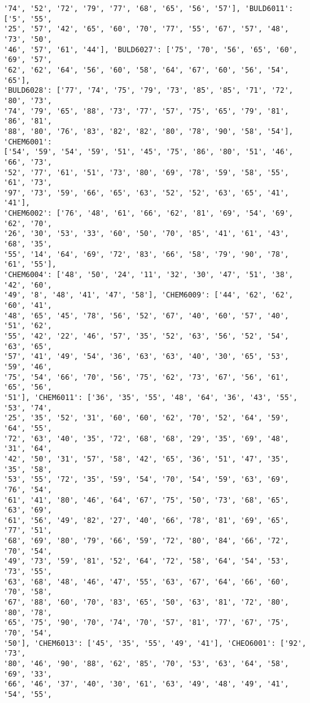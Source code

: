 \documentclass[11pt]{article}
\begin{document}
\begin{Verbatim}[commandchars=\\\{\}]
'74', '52', '72', '79', '77', '68', '65', '56', '57'], 'BULD6011': ['5', '55',
'25', '57', '42', '65', '60', '70', '77', '55', '67', '57', '48', '73', '50',
'46', '57', '61', '44'], 'BULD6027': ['75', '70', '56', '65', '60', '69', '57',
'62', '62', '64', '56', '60', '58', '64', '67', '60', '56', '54', '65'],
'BULD6028': ['77', '74', '75', '79', '73', '85', '85', '71', '72', '80', '73',
'74', '79', '65', '88', '73', '77', '57', '75', '65', '79', '81', '86', '81',
'88', '80', '76', '83', '82', '82', '80', '78', '90', '58', '54'], 'CHEM6001':
['54', '59', '54', '59', '51', '45', '75', '86', '80', '51', '46', '66', '73',
'52', '77', '61', '51', '73', '80', '69', '78', '59', '58', '55', '61', '73',
'97', '73', '59', '66', '65', '63', '52', '52', '63', '65', '41', '41'],
'CHEM6002': ['76', '48', '61', '66', '62', '81', '69', '54', '69', '62', '70',
'26', '30', '53', '33', '60', '50', '70', '85', '41', '61', '43', '68', '35',
'55', '14', '64', '69', '72', '83', '66', '58', '79', '90', '78', '61', '55'],
'CHEM6004': ['48', '50', '24', '11', '32', '30', '47', '51', '38', '42', '60',
'49', '8', '48', '41', '47', '58'], 'CHEM6009': ['44', '62', '62', '60', '41',
'48', '65', '45', '78', '56', '52', '67', '40', '60', '57', '40', '51', '62',
'55', '42', '22', '46', '57', '35', '52', '63', '56', '52', '54', '63', '65',
'57', '41', '49', '54', '36', '63', '63', '40', '30', '65', '53', '59', '46',
'75', '54', '66', '70', '56', '75', '62', '73', '67', '56', '61', '65', '56',
'51'], 'CHEM6011': ['36', '35', '55', '48', '64', '36', '43', '55', '53', '74',
'25', '35', '52', '31', '60', '60', '62', '70', '52', '64', '59', '64', '55',
'72', '63', '40', '35', '72', '68', '68', '29', '35', '69', '48', '31', '64',
'42', '50', '31', '57', '58', '42', '65', '36', '51', '47', '35', '35', '58',
'53', '55', '72', '35', '59', '54', '70', '54', '59', '63', '69', '76', '54',
'61', '41', '80', '46', '64', '67', '75', '50', '73', '68', '65', '63', '69',
'61', '56', '49', '82', '27', '40', '66', '78', '81', '69', '65', '77', '51',
'68', '69', '80', '79', '66', '59', '72', '80', '84', '66', '72', '70', '54',
'49', '73', '59', '81', '52', '64', '72', '58', '64', '54', '53', '73', '55',
'63', '68', '48', '46', '47', '55', '63', '67', '64', '66', '60', '70', '58',
'67', '88', '60', '70', '83', '65', '50', '63', '81', '72', '80', '80', '78',
'65', '75', '90', '70', '74', '70', '57', '81', '77', '67', '75', '70', '54',
'50'], 'CHEM6013': ['45', '35', '55', '49', '41'], 'CHEO6001': ['92', '73',
'80', '46', '90', '88', '62', '85', '70', '53', '63', '64', '58', '69', '33',
'66', '46', '37', '40', '30', '61', '63', '49', '48', '49', '41', '54', '55',

\end{Verbatim}
\end{document}
